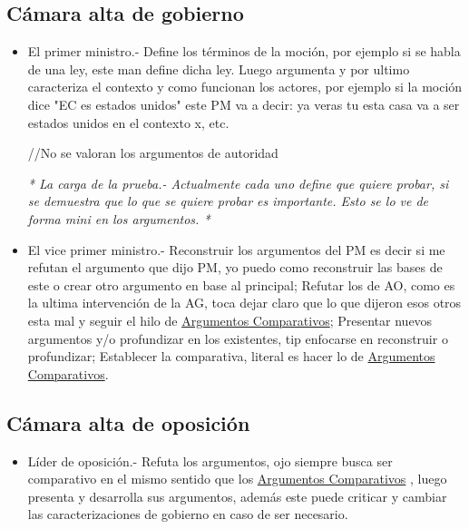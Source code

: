 \documentclass[11pt]{article}
\begin{document}
\subsection{Cámara alta de gobierno}
\label{sec:orgaf994e7}
\begin{itemize}
\item El primer ministro.- Define los términos de la moción, por ejemplo
si se habla de una ley, este man define dicha ley. Luego argumenta y
por ultimo caracteriza el contexto y como funcionan los actores, por
ejemplo si la moción dice "EC es estados unidos" este PM va a decir:
ya veras tu esta casa va a ser estados unidos en el contexto x, etc. 

//No se valoran los argumentos de autoridad

\emph{*
La carga de la prueba.- Actualmente cada uno define que quiere
probar, si se demuestra que lo que se quiere probar es importante.
Esto se lo ve de forma mini en los argumentos.
*}

\item El vice primer ministro.- Reconstruir los argumentos del PM es decir
si me refutan el argumento que dijo PM, yo puedo como reconstruir
las bases de este o crear otro argumento en base al principal; Refutar
los de AO, como es la ultima intervención de la AG, toca dejar claro
que lo que dijeron esos otros esta mal y seguir el hilo de
\href{Argumentacón_Debate_Competitivo.org}{Argumentos Comparativos}; Presentar nuevos argumentos y/o profundizar
en los existentes, tip enfocarse en reconstruir o profundizar;
Establecer la comparativa, literal es hacer lo de \href{Argumentacón_Debate_Competitivo.org}{Argumentos Comparativos}.
\end{itemize}



\subsection{Cámara alta de oposición}
\label{sec:orgee013d8}
\begin{itemize}
\item Líder de oposición.- Refuta los argumentos, ojo siempre busca ser
comparativo en el mismo sentido que los \href{Argumentacón_Debate_Competitivo.org}{Argumentos Comparativos} ,
luego presenta y desarrolla sus argumentos, además
este puede criticar y cambiar las caracterizaciones de gobierno en
caso de ser necesario.
\end{itemize}
\end{document}
